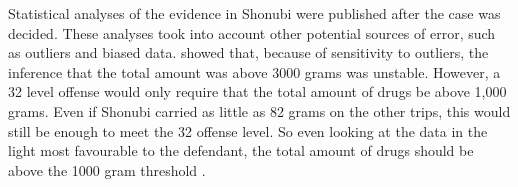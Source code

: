\documentclass{article}
\begin{document}
    
     Statistical analyses of the evidence in Shonubi were published after the case was decided.
     These analyses took into account other potential sources of error, such as outliers and biased data. 
     \citet{gastwirth2000shonubi} showed that, because of sensitivity to outliers, %
     the inference that the total amount was above 3000 grams was unstable. 
     However,  a 32 level offense would only require that the total amount of drugs be above 1,000 grams. Even if Shonubi carried as little as 82 grams on the other trips, this would still be enough to meet the 32 offense level. 
		 	 So even looking at the data in the light most favourable to the defendant, the total amount of drugs should be above the 1000 gram threshold  \citep{izenman2000introduction,gastwirth2000shonubi,izenman2000assessing}. 
	 
	 
\end{document}
